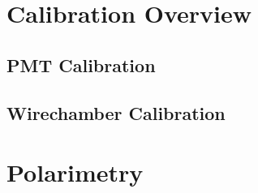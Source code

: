 



\section{Calibration Overview}

\subsection{PMT Calibration}

\subsection{Wirechamber Calibration}

 


\section{Polarimetry} \label{sec:polarimetry}







